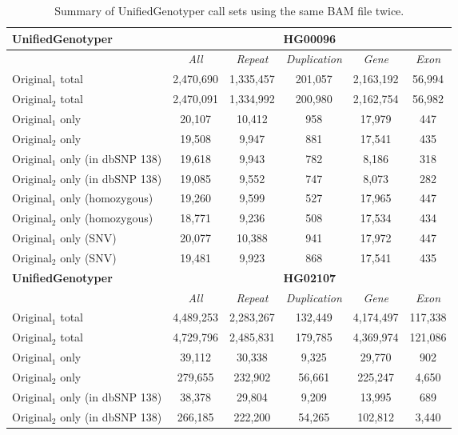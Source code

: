 \begin{table}[htb]
\caption{ Summary of UnifiedGenotyper call sets using the same BAM file twice. }
\begin{center}
\begin{tabular}{|l|c||c|c|c|c|}
\hline
{\bf UnifiedGenotyper} & \multicolumn{5}{|c|}{\bf HG00096} \\
\hline
\cline{2-6}
{\bf} & {\it All} & {\it Repeat} & {\it Duplication} & {\it Gene} & {\it Exon} \\
\hline
Original$_1$ total & 2,470,690 & 1,335,457 & 201,057 & 2,163,192 & 56,994 \\
\hline
Original$_2$ total & 2,470,091 & 1,334,992 & 200,980 & 2,162,754 & 56,982 \\
\hline
Original$_1$ only & 20,107 & 10,412 & 958 & 17,979 & 447 \\
\hline
Original$_2$ only & 19,508 & 9,947 & 881 & 17,541 & 435 \\
\hline
Original$_1$ only (in dbSNP 138) & 19,618 & 9,943 & 782 & 8,186 & 318 \\
\hline
Original$_2$ only (in dbSNP 138) & 19,085 & 9,552 & 747 & 8,073 & 282 \\
\hline
Original$_1$ only (homozygous) & 19,260 & 9,599 & 527 & 17,965 & 447 \\
\hline
Original$_2$ only (homozygous) & 18,771 & 9,236 & 508 & 17,534 & 434 \\
\hline
Original$_1$ only (SNV) & 20,077 & 10,388 & 941 & 17,972 & 447 \\
\hline
Original$_2$ only (SNV) & 19,481 & 9,923 & 868 & 17,541 & 435 \\
\hline
\hline
{\bf UnifiedGenotyper} & \multicolumn{5}{|c|}{\bf HG02107} \\
\hline
\cline{2-6}
{\bf} & {\it All} & {\it Repeat} & {\it Duplication} & {\it Gene} & {\it Exon} \\
\hline
Original$_1$ total & 4,489,253 & 2,283,267 & 132,449 & 4,174,497 & 117,338 \\
\hline
Original$_2$ total & 4,729,796 & 2,485,831 & 179,785 & 4,369,974 & 121,086 \\
\hline
Original$_1$ only & 39,112 & 30,338 & 9,325 & 29,770 & 902 \\
\hline
Original$_2$ only & 279,655 & 232,902 & 56,661 & 225,247 & 4,650 \\
\hline
Original$_1$ only (in dbSNP 138) & 38,378 & 29,804 & 9,209 & 13,995 & 689 \\
\hline
Original$_2$ only (in dbSNP 138) & 266,185 & 222,200 & 54,265 & 102,812 & 3,440 \\

\end{tabular}
\end{center}
\end{table}
